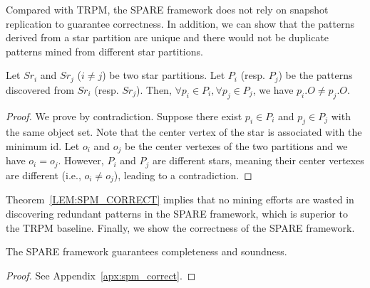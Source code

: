 Compared with TRPM, the SPARE framework does not rely on snapshot replication to guarantee correctness. In addition, we can show that the patterns derived from a star partition are unique and there would not be duplicate patterns mined from different star partitions.
\begin{theorem}
\label{LEM:SPM_CORRECT}
Let $Sr_i$ and $Sr_j$ ($i\neq j$) be two star partitions. Let $P_i$ (resp. $P_j$) be 
the patterns discovered from $Sr_i$ (resp. $Sr_j$). 
Then, $\forall p_i \in P_i, \forall p_j \in P_j$, we have $p_i.O \neq p_j.O$.
\end{theorem}
\begin{proof}
We prove by contradiction. Suppose there exist $p_i \in P_i$ and $p_j \in P_j$ with the same object set. Note that the center vertex of the star is associated with the minimum id. Let $o_i$ and $o_j$ be the center vertexes of the two partitions and we have $o_i=o_j$. However, $P_i$ and $P_j$ are different stars, meaning their center vertexes are different (i.e., $o_i\neq o_j$), leading to a contradiction. 
\end{proof}

Theorem~\ref{LEM:SPM_CORRECT} implies that no mining efforts are wasted in discovering redundant patterns  
in the SPARE framework, which is superior to the TRPM baseline. Finally, we show the correctness of the SPARE framework.
\begin{theorem}
\label{THM:SPM_CORRECT}
The SPARE framework guarantees completeness and soundness.
\end{theorem}
\begin{proof}
See Appendix~\ref{apx:spm_correct}.
\end{proof}
